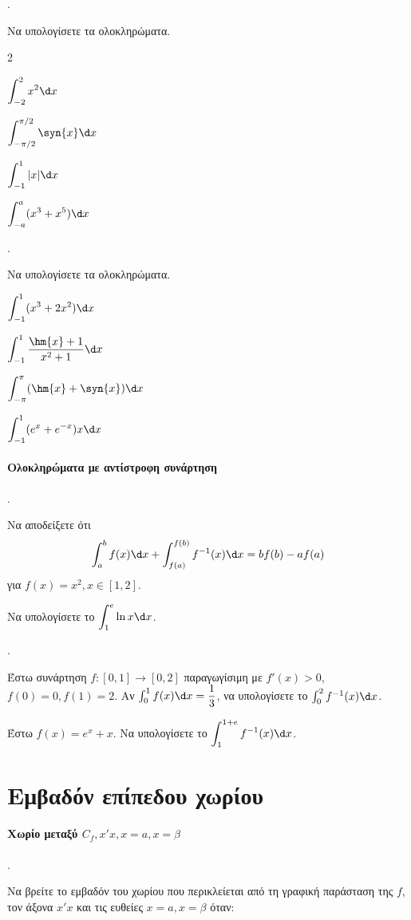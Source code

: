 \documentclass[11pt,a4paper,twocolumn]{article}
\newcounter{askhsh}
\newcommand{\askhsh}{\large\theaskhsh.\ \addtocounter{askhsh}{1}}
\begin{document}
\askhsh Να υπολογίσετε τα ολοκληρώματα.
\begin{multicols}{2}
\begin{alist}
\item $\displaystyle\int_{-2}^{2} x^2 \d x$
\item $\displaystyle\int_{-\pi/2}^{\pi/2} \syn{x} \d x$
\item $\displaystyle\int_{-1}^{1} |x| \d x$
\item $\displaystyle\int_{-a}^{a} (x^3+x^5) \d x$
\end{alist}
\end{multicols}

\askhsh Να υπολογίσετε τα ολοκληρώματα.
\begin{alist}
\item $\displaystyle\int_{-1}^{1} (x^3+2x^2) \d x$
\item $\displaystyle\int_{-1}^{1} \dfrac{\hm{x}+1}{x^2+1} \d x$
\item $\displaystyle\int_{-\pi}^{\pi} (\hm{x} + \syn{x}) \d x$
\item $\displaystyle\int_{-1}^{1} (e^x + e^{-x}) x \d x$
\end{alist}

\paragraph{Ολοκληρώματα με αντίστροφη συνάρτηση}
\askhsh
\begin{alist}
\item Να αποδείξετε ότι \[\int_{a}^{b} f(x) \d x + \int_{f(a)}^{f(b)} f^{-1}(x) \d x = b f(b) - a f(a)\] για $f(x)=x^2, x \in [1, 2]$.
\item Να υπολογίσετε το $\displaystyle\int_{1}^{e} \ln{x} \d x$.
\end{alist}
\askhsh
\begin{alist}
\item Έστω συνάρτηση $f: [0, 1] \to [0, 2]$ παραγωγίσιμη με $f'(x)>0$, $f(0)=0, f(1)=2$. Αν $\int_{0}^{1} f(x) \d x = \dfrac{1}{3}$, να υπολογίσετε το $\int_{0}^{2} f^{-1}(x) \d x$.
\item Έστω $f(x)=e^x+x$. Να υπολογίσετε το $\displaystyle\int_{1}^{1+e} f^{-1}(x) \d x$.
\end{alist}
\section{Εμβαδόν επίπεδου χωρίου}

\paragraph{Χωρίο μεταξύ $C_f,x'x,x=a,x=\beta$}
\askhsh Να βρείτε το εμβαδόν του χωρίου που περικλείεται από τη γραφική παράσταση της $f$, τον άξονα $x'x$ και τις ευθείες $x=a, x=\beta$ όταν:
\end{document}
